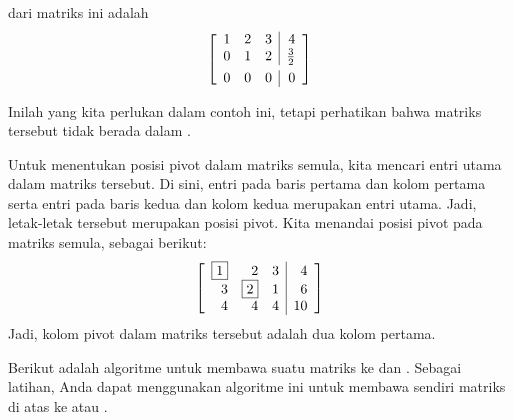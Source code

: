 \begin{solution} 
\ef \;dari matriks ini adalah
\begin{equation*}
\leftB
\begin{array}{rrr|r}
1 & 2 & 3 & 4 \\
0 & 1 & 2 & \vspace{0.05in}\frac{3}{2} \\
0 & 0 & 0 & 0
\end{array}
\rightB
\end{equation*}


Inilah yang kita perlukan dalam contoh ini, tetapi perhatikan bahwa matriks tersebut tidak berada dalam \rref.

Untuk menentukan posisi pivot dalam matriks semula, kita mencari entri utama dalam \ef \hspace{0.5mm} matriks tersebut.
Di sini, entri pada baris pertama dan kolom pertama serta entri pada baris kedua dan kolom kedua
merupakan entri utama. Jadi, letak-letak tersebut merupakan posisi pivot. Kita menandai posisi pivot pada matriks semula,
sebagai berikut:\
\begin{equation*}
\left[
\begin{array}{rrr|r}
\fbox{1} & 2 & 3 & 4 \\
3 & \fbox{2} & 1 & 6 \\
4 & 4 & 4 & 10
\end{array}
\right]
\end{equation*}
Jadi, kolom pivot dalam matriks tersebut adalah dua kolom pertama.
\end{solution}

Berikut adalah algoritme untuk membawa suatu matriks
ke \ef \;dan \rref. Sebagai latihan, Anda dapat menggunakan algoritme ini untuk membawa sendiri matriks di atas ke \ef \;atau \rref.

